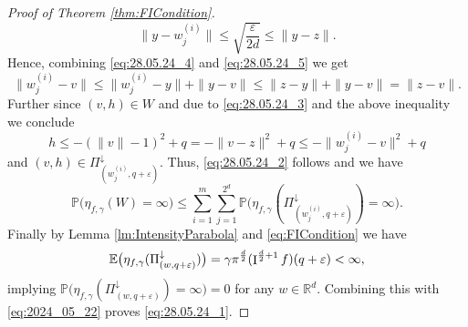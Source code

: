 \documentclass[11pt,a4paper]{article}
\theoremstyle{plain}
\theoremstyle{definition}
\theoremstyle{remark}
\def\EE{\mathbb{E}}
\def\PP{\mathbb{P}}
\def\RR{\mathbb{R}}
\newcommand{\frI}{\mathop{\mathrm{I}}\nolimits}
\begin{document}
\begin{proof}[Proof of Theorem \ref{thm:FICondition}]
\begin{equation}
        \|y-w_j^{(i)}\| \le \sqrt{\frac{\varepsilon}{2d}} \le \|y-z\|.
    \end{equation}
    Hence, combining \eqref{eq:28.05.24_4} and \eqref{eq:28.05.24_5} we get
    \[
        \|w_j^{(i)}-v\| \le \|w_j^{(i)}-y\|+\|y-v\| \le \|z-y\|+\|y-v\| = \|z-v\|.
    \]
    Further since $(v,h)\in W$ and due to \eqref{eq:28.05.24_3} and the above inequality we conclude
    \[
    h\leq -(\|v\|-1)^2+q=-\|v-z\|^2+q\le -\|w_j^{(i)}-v\|^2+q
    \]
    and $(v,h)\in \Pi_{(w_j^{(i)},q+\varepsilon)}^\downarrow$. Thus, \eqref{eq:28.05.24_2} follows and we have 
    \begin{equation}\label{eq:2024_05_22}
            \PP\big(\eta_{f,\gamma}(W)=\infty\big)\leq \sum_{i=1}^m \sum_{j=1}^{2^d} \PP\big(\eta_{f,\gamma}(\Pi_{(w_j^{(i)},q+\varepsilon)}^\downarrow)=\infty\big).
    \end{equation}
    Finally by Lemma \ref{lm:IntensityParabola} and \eqref{eq:FICondition} we have
    \[
        \EE\big(\eta_{f,\gamma}(\Pi_{(w,q+\varepsilon)}^\downarrow)\big) = \gamma\pi^{d\over 2}(\frI^{{d\over 2}+1}f)(q+\varepsilon)<\infty,
    \]
    implying $\PP\big(\eta_{f,\gamma}(\Pi_{(w,q+\varepsilon)}^\downarrow)=\infty\big)=0$ for any $w\in \RR^d$. Combining this with \eqref{eq:2024_05_22} proves \eqref{eq:28.05.24_1}.
    

\end{proof}
\end{document}
